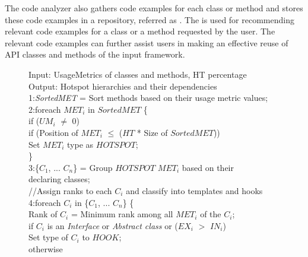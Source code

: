 The code analyzer also gathers code examples for each class or method and 
stores these code examples in a repository, referred as . The  is used
for recommending relevant code examples for a class or a method requested by the user. The relevant
code examples can further assist users in making an effective reuse of API classes and methods of the
input framework. 

\begin{figure}[t]
\begin{CodeOut}
Input: UsageMetrics of classes and methods, HT percentage\\
Output: Hotspot hierarchies and their dependencies\\
1:\emph{SortedMET} = Sort methods based on their usage metric values;\\
2:foreach \emph{$MET_i$} in $SortedMET$ \{\\
\hspace*{0.3in}if ($UM_i$ $\neq$ 0) \\
\hspace*{0.5in}if (Position of $MET_i$ $\leq$ ($HT$ * Size of $SortedMET$))\\
\hspace*{0.8in}Set $MET_i$ type as $HOTSPOT$; \\
\hspace*{0.2in}\}\\
3:\{$C_1$, ... $C_n$\} = Group $HOTSPOT$ $MET_i$ based on their \\\hspace*{0.2in}declaring classes;\\
//Assign ranks to each $C_i$ and classify into templates and hooks\\
4:foreach \emph{$C_i$} in \{$C_1$, ... $C_n$\} \{\\
\hspace*{0.3in}Rank of $C_i$ = Minimum rank among all $MET_i$ of the $C_i$;\\
\hspace*{0.3in}if $C_i$ is an \emph{Interface} or \emph{Abstract class} or ($EX_i$ $>$ $IN_i$)\\
\hspace*{0.5in}Set type of $C_i$ to $HOOK$;\\
\hspace*{0.3in}otherwise\\ 

\end{CodeOut}
\end{figure}
